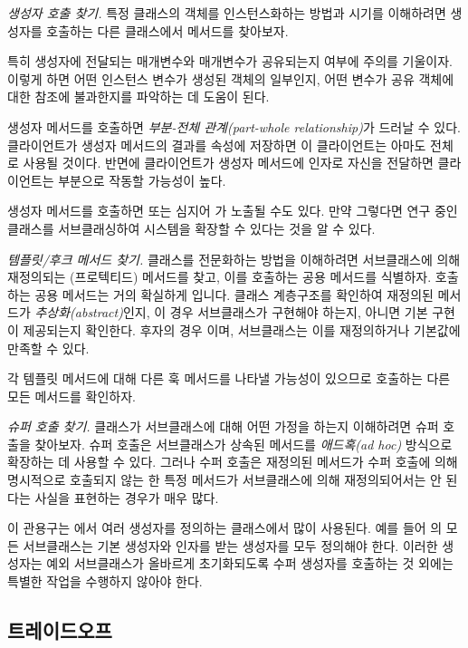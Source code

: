 \documentclass[a4paper,10pt,twoside]{book}
\begin{document}
\noindent
\emph{생성자 호출 찾기.}
특정 클래스의 객체를 인스턴스화하는 방법과 시기를 이해하려면 생성자를 호출하는 다른 클래스에서 메서드를 찾아보자.

특히 생성자에 전달되는 매개변수와 매개변수가 공유되는지 여부에 주의를 기울이자. 이렇게 하면 어떤 인스턴스 변수가 생성된 객체의 일부인지, 어떤 변수가 공유 객체에 대한 참조에 불과한지를 파악하는 데 도움이 된다.

생성자 메서드를 호출하면 \emph{부분-전체 관계(part-whole relationship)}가 드러날 수 있다. 클라이언트가 생성자 메서드의 결과를 속성에 저장하면 이 클라이언트는 아마도 전체로 사용될 것이다. 반면에 클라이언트가 생성자 메서드에 인자로 자신을 전달하면 클라이언트는 부분으로 작동할 가능성이 높다.

생성자 메서드를 호출하면  또는 심지어 가 노출될 수도 있다. 만약 그렇다면 연구 중인 클래스를 서브클래싱하여 시스템을 확장할 수 있다는 것을 알 수 있다.

\noindent
\emph{템플릿/후크 메서드 찾기.}
클래스를 전문화하는 방법을 이해하려면 서브클래스에 의해 재정의되는 (프로텍티드) 메서드를 찾고, 이를 호출하는 공용 메서드를 식별하자. 호출하는 공용 메서드는 거의 확실하게 입니다. 클래스 계층구조를 확인하여 재정의된 메서드가 \emph{추상화(abstract)}인지, 이 경우 서브클래스가 구현해야 하는지, 아니면 기본 구현이 제공되는지 확인한다. 후자의 경우 이며, 서브클래스는 이를 재정의하거나 기본값에 만족할 수 있다.

각 템플릿 메서드에 대해 다른 훅 메서드를 나타낼 가능성이 있으므로 호출하는 다른 모든 메서드를 확인하자.

\noindent
\emph{슈퍼 호출 찾기.}
클래스가 서브클래스에 대해 어떤 가정을 하는지 이해하려면 슈퍼 호출을 찾아보자. 슈퍼 호출은 서브클래스가 상속된 메서드를 \emph{애드혹(ad hoc)} 방식으로 확장하는 데 사용할 수 있다. 그러나 수퍼 호출은 재정의된 메서드가 수퍼 호출에 의해 명시적으로 호출되지 않는 한 특정 메서드가 서브클래스에 의해 재정의되어서는 안 된다는 사실을 표현하는 경우가 매우 많다.

이 관용구는 에서 여러 생성자를 정의하는 클래스에서 많이 사용된다. 예를 들어 의 모든 서브클래스는 기본 생성자와  인자를 받는 생성자를 모두 정의해야 한다. 이러한 생성자는 예외 서브클래스가 올바르게 초기화되도록 수퍼 생성자를 호출하는 것 외에는 특별한 작업을 수행하지 않아야 한다.

\subsection*{트레이드오프}
\end{document}
